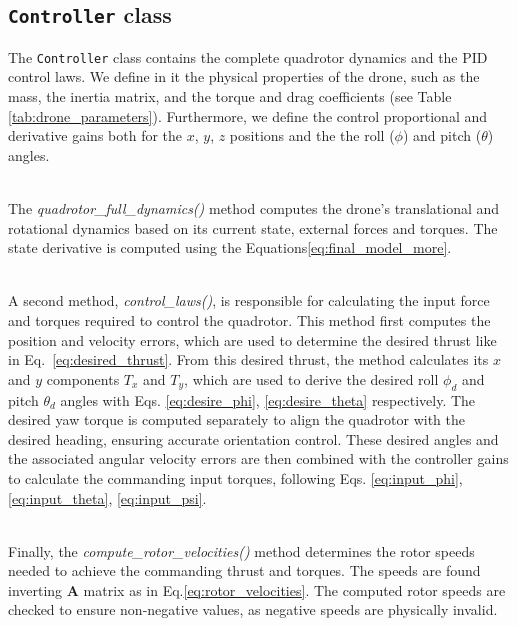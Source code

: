 \subsection{\texttt{Controller} class}
\label{sec:controller_class}
The \texttt{Controller} class contains the 
complete quadrotor dynamics and the PID control laws. 
We define in it the physical properties of the drone, such as the mass, 
the inertia matrix, and the torque and drag coefficients (see Table \ref{tab:drone_parameters}).
Furthermore, we define the control proportional and derivative 
gains both for the $x$, $y$, $z$ positions and the 
the roll (\(\phi\)) and pitch (\(\theta\)) angles.

\noindent\\
The \textit{quadrotor\_full\_dynamics()} method computes 
the drone's translational and rotational dynamics based on 
its current state, external forces and torques. 
The state derivative is computed using the Equations\ref{eq:final_model_more}.

\noindent\\
A second method, \textit{control\_laws()}, is responsible 
for calculating the input force and torques required 
to control the quadrotor. This method first computes 
the position and velocity errors, which are used to 
determine the desired thrust like in Eq.~\ref{eq:desired_thrust}. 
From this desired thrust, the method calculates its 
$x$ and $y$ components \(T_x\) and \(T_y\), 
which are used to derive the desired roll \(\phi_d\) 
and pitch \(\theta_d\) angles with Eqs. \ref{eq:desire_phi}, 
\ref{eq:desire_theta} respectively. 
The desired yaw torque is computed separately 
to align the quadrotor with the desired heading, 
ensuring accurate orientation control. These desired angles and the 
associated angular velocity errors are then combined 
with the controller gains to calculate the commanding input torques,
following Eqs. \ref{eq:input_phi}, \ref{eq:input_theta}, 
\ref{eq:input_psi}. 

\noindent\\
Finally, the \textit{compute\_rotor\_velocities()} 
method determines the rotor speeds needed to achieve 
the commanding thrust and torques. The speeds are found 
inverting $\mathbf{A}$ matrix as in Eq.\ref{eq:rotor_velocities}.
The computed rotor speeds are checked 
to ensure non-negative values, as negative speeds are 
physically invalid.

